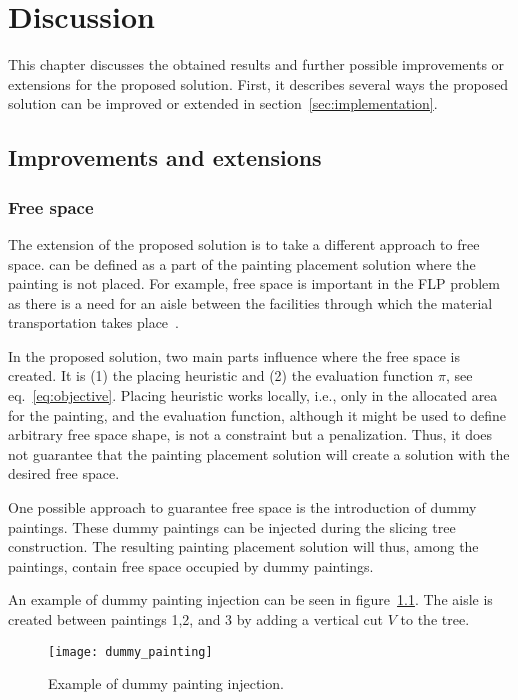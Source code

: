 \chapter{Discussion}\label{ch:discussion}

This chapter discusses the obtained results and further possible improvements or extensions for the proposed solution.
First, it describes several ways the proposed solution can be improved or extended in section~\ref{sec:implementation}.


\section{Improvements and extensions}\label{sec:improvements}

\subsection{Free space}\label{subsec:free-space}

The extension of the proposed solution is to take a different approach to free space.
 can be defined as a part of the painting placement solution where the painting is not placed.
For example, free space is important in the FLP problem as there is a need for an aisle between the facilities
through which the material transportation takes place~\cite{scholzExtensionsSTaTSPractical2010}.

In the proposed solution, two main parts influence where the free space is created.
It is (1) the placing heuristic and (2) the evaluation function $\pi$, see eq.~\ref{eq:objective}.
Placing heuristic works locally, i.e., only in the allocated area for the painting, and the evaluation
function, although it might be used to define arbitrary free space shape, is not a constraint but a penalization.
Thus, it does not guarantee that the painting placement solution will create a solution with the desired free space.

One possible approach to guarantee free space is the introduction of dummy paintings.
These dummy paintings can be injected during the slicing tree construction.
The resulting painting placement solution will thus, among the paintings, contain free space occupied by dummy paintings.

An example of dummy painting injection can be seen in figure~\ref{fig:dummy-painting}.
The aisle is created between paintings 1,2, and 3 by adding a vertical cut $V$ to the tree.


\begin{figure}[h!]
    \texttt{[image: dummy\_painting]}
    \caption{Example of dummy painting injection.}
    \label{fig:dummy-painting}
\end{figure}


